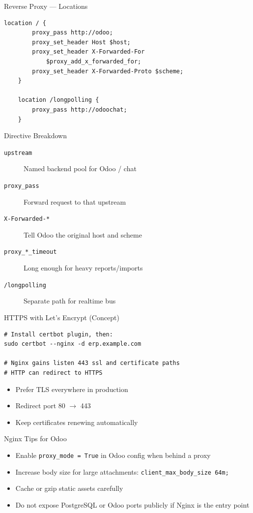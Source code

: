 \begin{frame}[fragile]{Reverse Proxy --- Locations}
\begin{lstlisting}[language={}]
    location / {
        proxy_pass http://odoo;
        proxy_set_header Host $host;
        proxy_set_header X-Forwarded-For
            $proxy_add_x_forwarded_for;
        proxy_set_header X-Forwarded-Proto $scheme;
    }

    location /longpolling {
        proxy_pass http://odoochat;
    }
\end{lstlisting}
\end{frame}

\begin{frame}{Directive Breakdown}
\begin{description}
  \item[\texttt{upstream}] Named backend pool for Odoo / chat
  \item[\texttt{proxy\_pass}] Forward request to that upstream
  \item[\texttt{X-Forwarded-*}] Tell Odoo the original host and scheme
  \item[\texttt{proxy\_*\_timeout}] Long enough for heavy reports/imports
  \item[\texttt{/longpolling}] Separate path for realtime bus
\end{description}
\end{frame}

\begin{frame}[fragile]{HTTPS with Let's Encrypt (Concept)}
\begin{lstlisting}[style=bash]
# Install certbot plugin, then:
sudo certbot --nginx -d erp.example.com

# Nginx gains listen 443 ssl and certificate paths
# HTTP can redirect to HTTPS
\end{lstlisting}

\vspace{0.5em}
\begin{itemize}
  \item Prefer TLS everywhere in production
  \item Redirect port 80 $\rightarrow$ 443
  \item Keep certificates renewing automatically
\end{itemize}
\end{frame}

\begin{frame}{Nginx Tips for Odoo}
\begin{itemize}
  \item Enable \texttt{proxy\_mode = True} in Odoo config when behind a proxy
  \item Increase body size for large attachments:
        \texttt{client\_max\_body\_size 64m;}
  \item Cache or gzip static assets carefully
  \item Do not expose PostgreSQL or Odoo ports publicly if Nginx is the entry point
\end{itemize}
\end{frame}
